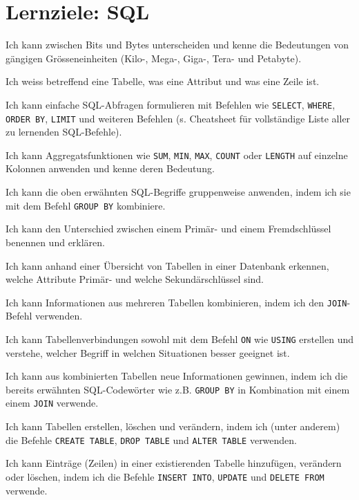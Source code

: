 \lstset{style=sql}

\section*{Lernziele: SQL}
\begin{todolist}
\item Ich kann zwischen Bits und Bytes unterscheiden und kenne die Bedeutungen von gängigen Grösseneinheiten (Kilo-, Mega-, Giga-, Tera- und Petabyte).
\item Ich weiss betreffend eine Tabelle, was eine Attribut und was eine Zeile ist.
\item Ich kann einfache SQL-Abfragen formulieren mit Befehlen wie \lstinline|SELECT|, \lstinline|WHERE|,  \lstinline|ORDER BY|, \lstinline|LIMIT| und weiteren Befehlen (s. Cheatsheet für vollständige Liste aller zu lernenden SQL-Befehle).
\item Ich kann Aggregatsfunktionen wie \lstinline|SUM|, \lstinline|MIN|, \lstinline|MAX|, \lstinline|COUNT| oder \lstinline|LENGTH| auf einzelne Kolonnen anwenden und kenne deren Bedeutung.
\item Ich kann die oben erwähnten SQL-Begriffe gruppenweise anwenden, indem ich sie mit dem Befehl \lstinline|GROUP BY| kombiniere.
\item Ich kann den Unterschied zwischen einem Primär- und einem Fremdschlüssel benennen und erklären.
\item Ich kann anhand einer Übersicht von Tabellen in einer Datenbank erkennen, welche Attribute Primär- und welche Sekundärschlüssel sind.
\item Ich kann Informationen aus mehreren Tabellen kombinieren, indem ich den \lstinline|JOIN|-Befehl verwenden.
\item Ich kann Tabellenverbindungen sowohl mit dem Befehl \lstinline|ON| wie \lstinline|USING| erstellen und verstehe, welcher Begriff in welchen Situationen besser geeignet ist.
\item Ich kann aus kombinierten Tabellen neue Informationen gewinnen, indem ich die bereits erwähnten SQL-Codewörter wie z.B. \lstinline|GROUP BY| in Kombination mit einem einem \lstinline|JOIN| verwende.
\item Ich kann Tabellen erstellen, löschen und verändern, indem ich (unter anderem) die Befehle \lstinline|CREATE TABLE|, \lstinline|DROP TABLE| und \lstinline|ALTER TABLE| verwenden.
\item Ich kann Einträge (Zeilen) in einer existierenden Tabelle hinzufügen, verändern oder löschen, indem ich die Befehle \lstinline|INSERT INTO|, \lstinline|UPDATE| und \lstinline|DELETE FROM| verwende.
\end{todolist}